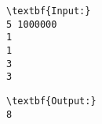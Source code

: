 \begin{verbatim}
\textbf{Input:}
5 1000000
1
1
3
3\end{verbatim}
\begin{verbatim}
\textbf{Output:}
8\end{verbatim}